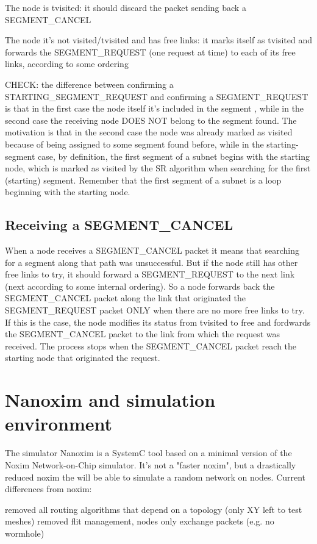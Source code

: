 \documentclass[conference]{IEEEtran}
\begin{document}
The node is tvisited: it should discard the packet sending
back a SEGMENT\_CANCEL 

The node it's not visited/tvisited and has free
links: it marks itself as tvisited and forwards the SEGMENT\_REQUEST
(one request at time) to each of its free links, according to some
ordering

CHECK: the difference between confirming a STARTING\_SEGMENT\_REQUEST
and confirming a SEGMENT\_REQUEST is that in the first case the node
itself it's included in the segment , while in the second case the
receiving node DOES NOT belong to the segment found. The motivation is
that in the second case the node was already marked as visited because
of being assigned to some segment found before, while in the
starting-segment case, by definition, the first segment of a subnet
begins with the starting node, which is marked as visited by the SR
algorithm when searching for the first (starting) segment. Remember
that the first segment of a subnet is a loop beginning with the
starting node. 

\subsection{Receiving a SEGMENT\_CANCEL}
When a node receives a SEGMENT\_CANCEL packet it means that searching
for a segment along that path was unsuccessful. But if the node still
has other free links to try, it should forward a SEGMENT\_REQUEST to
the next link (next according to some internal ordering). So a node
forwards back the SEGMENT\_CANCEL packet along the link that originated
the SEGMENT\_REQUEST packet ONLY when there are no more free links to
try. If this is the case, the node modifies its status from tvisited
to free and fordwards the SEGMENT\_CANCEL packet to the link from which
the request was received. The process stops when the SEGMENT\_CANCEL
packet reach the starting node that originated the request.

\section{Nanoxim and simulation environment}

The simulator Nanoxim is a SystemC tool based on a minimal version of
the Noxim Network-on-Chip simulator. It's not a "faster noxim", but a
drastically reduced noxim the will be able to simulate a random
network on nodes. Current differences from noxim:

removed all routing algorithms that depend on a topology (only XY left
to test meshes) removed flit management, nodes only exchange packets
(e.g. no wormhole)
\end{document}
